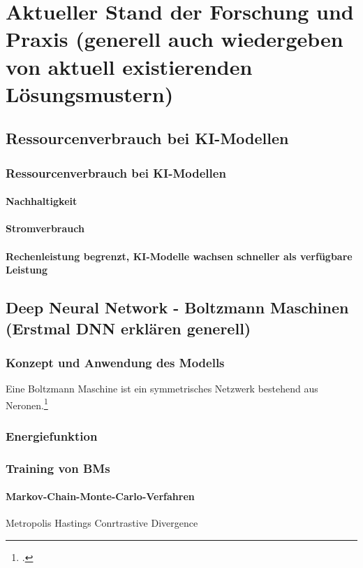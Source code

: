 \chapter{Aktueller Stand der Forschung und Praxis (generell auch wiedergeben von aktuell existierenden Lösungsmustern)}

\section{Ressourcenverbrauch bei KI-Modellen}
\subsection{Ressourcenverbrauch bei KI-Modellen}
\subsubsection{Nachhaltigkeit}
\subsubsection{Stromverbrauch}
\subsubsection{Rechenleistung begrenzt, KI-Modelle wachsen schneller als verfügbare Leistung}

\section{Deep Neural Network - Boltzmann Maschinen (Erstmal DNN erklären generell)}
\subsection{Konzept und Anwendung des Modells }

Eine Boltzmann Maschine ist ein symmetrisches Netzwerk bestehend aus Neronen.\Footcite[Vgl.][260]{amariInformationGeometryBoltzmann1992}

\subsection{Energiefunktion}
\subsection{Training von BMs}
\subsubsection{Markov-Chain-Monte-Carlo-Verfahren}
Metropolis Hastings 
Conrtrastive Divergence

